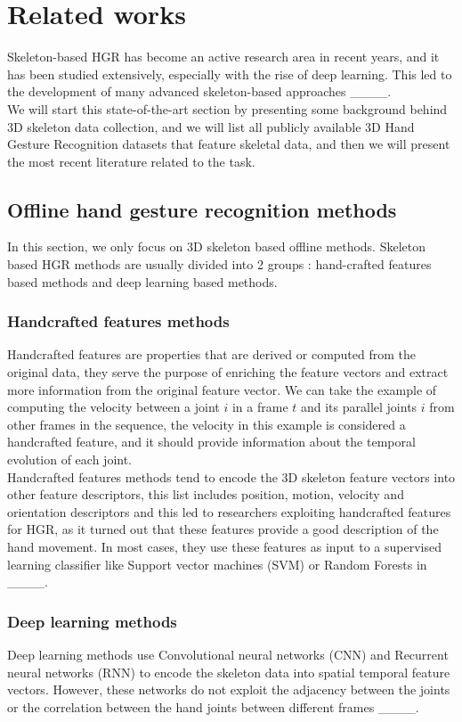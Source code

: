 \section{Related works}
Skeleton-based HGR has become an active research area in recent years, and it has been studied extensively, especially with the rise of deep learning. This led to the development of many advanced skeleton-based approaches ____. \\
We will start this state-of-the-art section by presenting some background behind 3D skeleton data collection, and we will list all publicly available 3D Hand Gesture Recognition datasets that feature skeletal data, and then we will present the most recent literature related to the task.

\subsection{Offline hand gesture recognition methods}
In this section, we only focus on 3D skeleton based offline methods. Skeleton based HGR methods are usually divided into 2 groups : hand-crafted features based methods and deep learning based methods. 
\subsubsection{Handcrafted features methods}
Handcrafted features are properties that are derived or computed from the original data, they serve the purpose of enriching the feature vectors and extract more information from the original feature vector. We can take the example of computing the velocity between a joint $i$ in a frame $t$ and its parallel joints $i$ from other frames in the sequence, the velocity in this example is considered a handcrafted feature, and it should provide information about the temporal evolution of each joint. \\
Handcrafted features methods tend to encode the 3D skeleton feature vectors into other feature descriptors,  this list includes position, motion, velocity and orientation descriptors and this led to researchers exploiting handcrafted features for HGR, as it turned out that these features provide a good description of the hand movement. In most cases, they use these features as input to a supervised learning classifier like Support vector machines (SVM) or Random Forests in ____. 
\subsubsection{Deep learning methods}
Deep learning methods use Convolutional neural networks (CNN) and Recurrent neural networks (RNN) to encode the skeleton data into spatial temporal feature vectors. However, these networks do not exploit the adjacency between the joints or the correlation between the hand joints between different frames ____.\\

